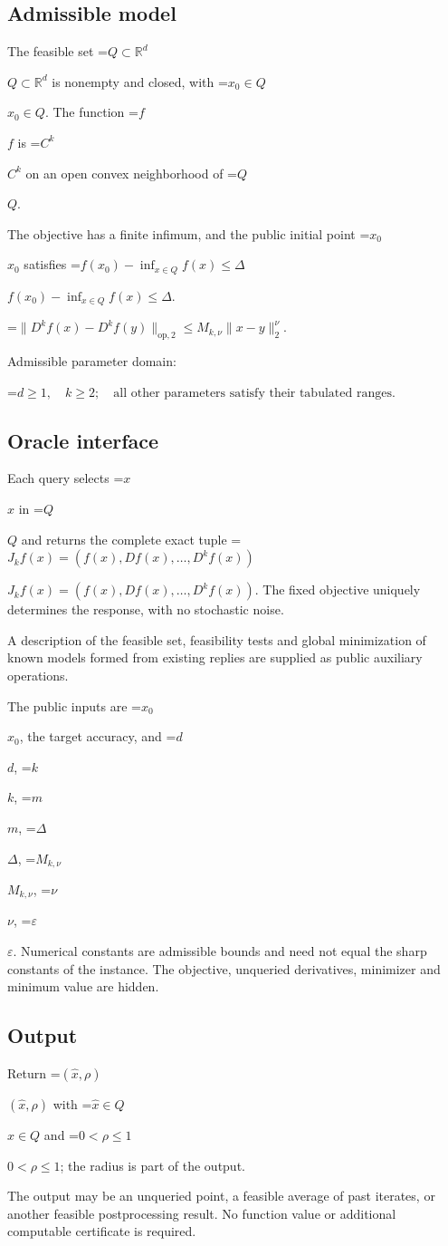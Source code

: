 \documentclass[10pt,a4paper]{article}
\newcommand{\AtlasMath}[1]{\par\begingroup\centering\setbox0=\hbox{$\displaystyle #1$}\ifdim\wd0>1.4\linewidth\typeout{ATLAS WIDE FORMULA: \the\wd0}\fi\ifdim\wd0>\linewidth\resizebox{\linewidth}{!}{\box0}\else\box0\fi\par\endgroup}
\newcommand{\AtlasInlineMath}[1]{\begingroup\setbox0=\hbox{$#1$}\ifdim\wd0>.4\linewidth\endgroup\AtlasMath{#1}\else\endgroup$#1$\fi}
\begin{document}
\subsection{Admissible model}
The feasible set \AtlasInlineMath{Q\subset\mathbb{R}^d} is nonempty and closed, with \AtlasInlineMath{x_0\in Q}. The function \AtlasInlineMath{f} is \AtlasInlineMath{C^k} on an open convex neighborhood of \AtlasInlineMath{Q}.

The objective has a finite infimum, and the public initial point \AtlasInlineMath{x_0} satisfies \AtlasInlineMath{f(x_0)-\inf_{x\in Q}f(x)\le\Delta}.


\AtlasMath{\|D^{k}f(x)-D^{k}f(y)\|_{\mathrm{op},2}\le M_{k,\nu}\|x-y\|_{2}^{\nu}.}


Admissible parameter domain:


\AtlasMath{d\ge1,\quad k\ge2;\quad\text{all other parameters satisfy their tabulated ranges}.}


\subsection{Oracle interface}
Each query selects \AtlasInlineMath{x} in \AtlasInlineMath{Q} and returns the complete exact tuple \AtlasInlineMath{J_{k}f(x)=(f(x),Df(x),\ldots,D^{k}f(x))}. The fixed objective uniquely determines the response, with no stochastic noise.

A description of the feasible set, feasibility tests and global minimization of known models formed from existing replies are supplied as public auxiliary operations.

The public inputs are \AtlasInlineMath{x_0}, the target accuracy, and \AtlasInlineMath{d}, \AtlasInlineMath{k}, \AtlasInlineMath{m}, \AtlasInlineMath{\Delta}, \AtlasInlineMath{M_{k,\nu}}, \AtlasInlineMath{\nu}, \AtlasInlineMath{\varepsilon}. Numerical constants are admissible bounds and need not equal the sharp constants of the instance. The objective, unqueried derivatives, minimizer and minimum value are hidden.

\subsection{Output}
Return \AtlasInlineMath{(\widehat{x},\rho)} with \AtlasInlineMath{\widehat{x}\in Q} and \AtlasInlineMath{0<\rho\le1}; the radius is part of the output.

The output may be an unqueried point, a feasible average of past iterates, or another feasible postprocessing result. No function value or additional computable certificate is required.
\end{document}
